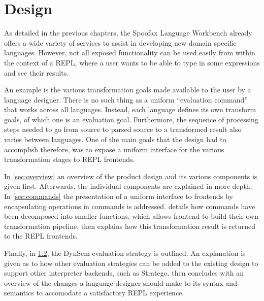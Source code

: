 \chapter{Design}
\label{cha:design}

As detailed in the previous chapters, the Spoofax Language Workbench already
offers a wide variety of services to assist in developing new domain specific
languages. However, not all exposed functionality can be used easily from within
the context of a REPL, where a user wants to be able to type in some expressions
and see their results.

An example is the various transformation goals made available to the user by a
language designer. There is no such thing as a uniform ``evaluation command''
that works across all languages. Instead, each language defines its own
transform goals, of which one is an evaluation goal.  Furthermore, the sequence
of processing steps needed to go from source to parsed source to a transformed
result also varies between languages. One of the main goals that the design had to
accomplish therefore, was to expose a uniform interface for the various
transformation stages to REPL frontends.

In \cref{sec:overview} an overview of the product design and its various
components is given first. Afterwards, the individual components are
explained in more depth. In \cref{sec:commands} the presentation of a uniform
interface to frontends by encapsulating operations in commands is addressed.
 details how commands have been
decomposed into smaller functions, which allows frontend to build their own
transformation pipeline.  then explains how this
transformation result is returned to the REPL frontends.

Finally, in \cref{sec:eval-strat}, the DynSem evaluation strategy is outlined. 
An explanation is given as to how other evaluation strategies
can be added to the existing design to support other interpreter backends,
such as Stratego.  then concludes with an overview of the
changes a language designer should make to its syntax and semantics to
accomodate a satisfactory REPL experience.







\section{}
\label{sec:visitor}

\section{}
\label{sec:eval-strat}

